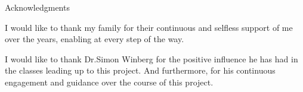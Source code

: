 \begin{centerpage}{Acknowledgments}

I would like to thank my family for their continuous and selfless support of me over the
    years, enabling at every step of the way.

I would like to thank Dr.Simon Winberg for the positive influence he has had in
    the classes leading up to this project. And furthermore, for his continuous
    engagement and guidance over the course of this project. 

\end{centerpage}
